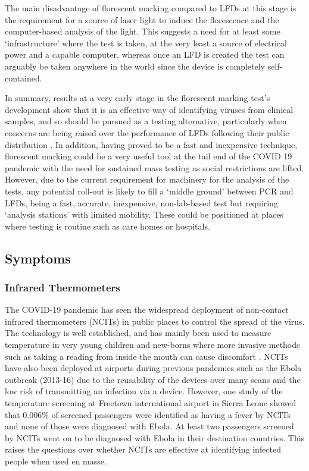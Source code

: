 \documentclass[11pt]{report}
\begin{document}
The main disadvantage of florescent marking compared to LFDs at this stage is the requirement for a source of laser light to induce the florescence and the computer-based analysis of the light. This suggests a need for at least some ‘infrastructure’ where the test is taken, at the very least a source of electrical power and a capable computer, whereas once an LFD is created the test can arguably be taken anywhere in the world since the device is completely self-contained.

In summary, results at a very early stage in the florescent marking test’s development show that it is an effective way of identifying viruses from clinical samples, and so should be pursued as a testing alternative, particularly when concerns are being raised over the performance of LFDs following their public distribution \cite{testing10}. In addition, having proved to be a fast and inexpensive technique, florescent marking could be a very useful tool at the tail end of the COVID 19 pandemic with the need for sustained mass testing as social restrictions are lifted.  However, due to the current requirement for machinery for the analysis of the tests, any potential roll-out is likely to fill a ‘middle ground’ between PCR and LFDs, being a fast, accurate, inexpensive, non-lab-based test but requiring ‘analysis stations’ with limited mobility. These could be positioned at places where testing is routine such as care homes or hospitals.


 
 
 



			
			\subsection{Symptoms}		

\subsubsection{Infrared Thermometers}
			
The COVID-19 pandemic has seen the widespread deployment of non-contact infrared thermometers (NCITs) in public places to control the spread of the virus. The technology is well established, and has mainly been used to measure temperature in very young children and new-borns where more invasive methods such as taking a reading from inside the mouth can cause discomfort \cite{ir1}. NCITs have also been deployed at airports during previous pandemics such as the Ebola outbreak (2013-16) \cite{ir2} due to the reusability of the devices over many scans and the low risk of transmitting an infection via a device. However, one study of the temperature screening at Freetown international airport in Sierra Leone \cite{ir3} showed that 0.006\% of screened passengers were identified as having a fever by NCITs and none of those were diagnosed with Ebola. At least two passengers screened by NCITs went on to be diagnosed with Ebola in their destination countries. This raises the questions over whether NCITs are effective at identifying infected people when used en masse.
\end{document}

